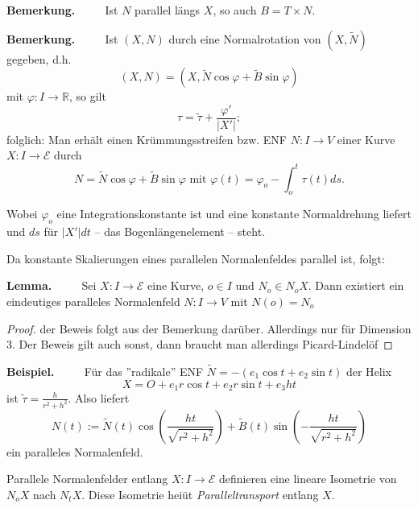 \documentclass[a4paper,oneside,11pt,DIV=12,parskip=half]{scrartcl}
\newcommand{\R}{\mathbb R}
\newcommand{\E}{\mathcal E}
\newenvironment{note}{\textbf{Bemerkung.} ~~~~}{}
\newenvironment{lemma}{\textbf{Lemma.} ~~~~}{}
\newenvironment{example}{\textbf{Beispiel.} ~~~~}{}
\newenvironment{lemma, definition}{\textbf{Lemma und Definition.} ~~~~}{}
\newenvironment{note, example}{\textbf{Bemerkung und Beispiel.} ~~~~}{}
\newenvironment{note, definition}{\textbf{Bemerkung und Definition.} ~~~~}{}
\begin{document}
\begin{note}
	Ist $N$ parallel längs $X$, so auch $B = T\times N.$
\end{note}

\begin{note}
	Ist $(X,N)$ durch eine Normalrotation von $(X, \widetilde{N})$ gegeben, d.h. \[ (X,N) = (X,\widetilde{N} \cos \varphi + \widetilde{B}\sin \varphi) \] mit $\varphi: I \rightarrow \R$, so gilt 
	\[ \tau = \widetilde{\tau} + \frac{\varphi '}{|X'|}; \]
	folglich: Man erhält einen Krümmungsstreifen bzw. ENF $N: I \rightarrow V$ einer Kurve $X: I \rightarrow \E$ durch \[ N = \widetilde{N} \cos \varphi + \widetilde{B} \sin \varphi \text{ mit } \varphi(t) = \varphi_o - \int_{o}^{t} \tau(t) ds. \]
	
	Wobei $\varphi_o$ eine Integrationskonstante ist und eine konstante Normaldrehung liefert und $ds$ für $|X'| dt$ -- das Bogenlängenelement -- steht.
	
	Da konstante Skalierungen eines parallelen Normalenfeldes parallel ist, folgt:
	
	
\end{note}

\begin{lemma}
	Sei $X: I \rightarrow \E$ eine Kurve, $o \in I$ und $N_o \in N_oX$. Dann existiert ein eindeutiges paralleles Normalenfeld $N: I \rightarrow V$ mit $N(o) = N_o$
\end{lemma}

\begin{proof}
	der Beweis folgt aus der Bemerkung darüber. Allerdings nur für Dimension 3. Der Beweis gilt auch sonst, dann braucht man allerdings Picard-Lindelöf
\end{proof}

\begin{example}
	Für das ''radikale'' ENF $\widetilde{N} = - (e_1 \cos t + e_2 \sin t)$ der Helix
	$$ X = O + e_1 r \cos t + e_2 r \sin t + e_3 h t$$
	ist $\widetilde{\tau} = \frac{h}{r^2 + h^2}$. Also liefert \[ N(t) := \widetilde{N}(t) \cos (\frac{ht}{\sqrt{r^2 + h^2}}) + \widetilde{B}(t) \sin (-\frac{ht}{\sqrt{r^2 + h^2}}) \] ein paralleles Normalenfeld.

\end{example}

\begin{lemma, definition}
	Parallele Normalenfelder entlang $X: I \rightarrow \E$ definieren eine lineare Isometrie von $N_oX$ nach $N_tX$. Diese Isometrie heiüt \textit{Paralleltransport} entlang $X$.
\end{lemma, definition}
\end{document}
